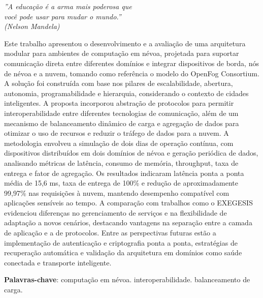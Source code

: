 \begin{epigrafe}
	\vspace*{\fill}
	\begin{flushright}
		\textit{''A educação é a arma mais poderosa que \\
            você pode usar para mudar o mundo.'' \\
            (Nelson Mandela)
            }
	\end{flushright}
\end{epigrafe}


\setlength{\absparsep}{18pt} %
\begin{resumo}
	\SingleSpacing
	Este trabalho apresentou o desenvolvimento e a avaliação de uma arquitetura modular para ambientes de computação em névoa, projetada para suportar comunicação direta entre diferentes domínios e integrar dispositivos de borda, nós de névoa e a nuvem, tomando como referência o modelo do OpenFog Consortium. A solução foi construída com base nos pilares de escalabilidade, abertura, autonomia, programabilidade e hierarquia, considerando o contexto de cidades inteligentes. A proposta incorporou abstração de protocolos para permitir interoperabilidade entre diferentes tecnologias de comunicação, além de um mecanismo de balanceamento dinâmico de carga e agregação de dados para otimizar o uso de recursos e reduzir o tráfego de dados para a nuvem. A metodologia envolveu a simulação de dois dias de operação contínua, com dispositivos distribuídos em dois domínios de névoa e geração periódica de dados, analisando métricas de latência, consumo de memória, throughput, taxa de entrega e fator de agregação. Os resultados indicaram latência ponta a ponta média de 15,6 ms, taxa de entrega de 100\% e redução de aproximadamente 99,97\% nas requisições à nuvem, mantendo desempenho compatível com aplicações sensíveis ao tempo. A comparação com trabalhos como o EXEGESIS evidenciou diferenças no gerenciamento de serviços e na flexibilidade de adaptação a novos cenários, destacando vantagens na separação entre a camada de aplicação e a de protocolos. Entre as perspectivas futuras estão a implementação de autenticação e criptografia ponta a ponta, estratégias de recuperação automática e validação da arquitetura em domínios como saúde conectada e transporte inteligente.
	
	\textbf{Palavras-chave}: computação em névoa. interoperabilidade. balanceamento de carga.
\end{resumo}

